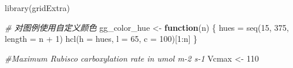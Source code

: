 \documentclass[
]{krantz}
\makeatletter
\newenvironment{Shaded}{\begin{snugshade}}{\end{snugshade}}
\newcommand{\AttributeTok}[1]{\textcolor[rgb]{0.77,0.63,0.00}{#1}}
\newcommand{\CommentTok}[1]{\textcolor[rgb]{0.56,0.35,0.01}{\textit{#1}}}
\newcommand{\ControlFlowTok}[1]{\textcolor[rgb]{0.13,0.29,0.53}{\textbf{#1}}}
\newcommand{\DecValTok}[1]{\textcolor[rgb]{0.00,0.00,0.81}{#1}}
\newcommand{\FunctionTok}[1]{\textcolor[rgb]{0.00,0.00,0.00}{#1}}
\newcommand{\NormalTok}[1]{#1}
\newcommand{\OtherTok}[1]{\textcolor[rgb]{0.56,0.35,0.01}{#1}}
\newcommand{\SpecialCharTok}[1]{\textcolor[rgb]{0.00,0.00,0.00}{#1}}
\newenvironment{kframe}{%
\medskip{}
\setlength{\fboxsep}{.8em}
 \def\at@end@of@kframe{}%
 \ifinner\ifhmode%
  \def\at@end@of@kframe{\end{minipage}}%
  \begin{minipage}{\columnwidth}%
 \fi\fi%
 \def\FrameCommand##1{\hskip\@totalleftmargin \hskip-\fboxsep
 \colorbox{shadecolor}{##1}\hskip-\fboxsep
     \hskip-\linewidth \hskip-\@totalleftmargin \hskip\columnwidth}%
 \MakeFramed {\advance\hsize-\width
   \@totalleftmargin\z@ \linewidth\hsize
   \@setminipage}}%
 {\par\unskip\endMakeFramed%
 \at@end@of@kframe}
\renewenvironment{Shaded}{\begin{kframe}}{\end{kframe}}
\makeatother
\begin{document}
\begin{Shaded}
\begin{Highlighting}[]
\FunctionTok{library}\NormalTok{(gridExtra)}

\CommentTok{\# 对图例使用自定义颜色}
\NormalTok{gg\_color\_hue }\OtherTok{\textless{}{-}} \ControlFlowTok{function}\NormalTok{(n) \{}
\NormalTok{  hues }\OtherTok{=} \FunctionTok{seq}\NormalTok{(}\DecValTok{15}\NormalTok{, }\DecValTok{375}\NormalTok{, }\AttributeTok{length =}\NormalTok{ n }\SpecialCharTok{+} \DecValTok{1}\NormalTok{)}
  \FunctionTok{hcl}\NormalTok{(}\AttributeTok{h =}\NormalTok{ hues, }\AttributeTok{l =} \DecValTok{65}\NormalTok{, }\AttributeTok{c =} \DecValTok{100}\NormalTok{)[}\DecValTok{1}\SpecialCharTok{:}\NormalTok{n]}
\NormalTok{\}}

\CommentTok{\#Maximum Rubisco carboxylation rate in umol m{-}2 s{-}1}
\NormalTok{Vcmax }\OtherTok{\textless{}{-}} \DecValTok{110}


\end{Highlighting}
\end{Shaded}
\end{document}
